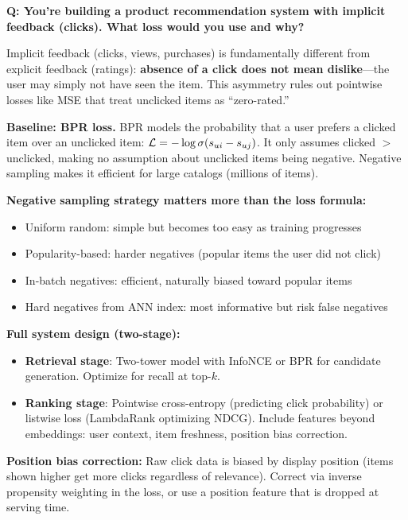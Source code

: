 \begin{interviewq}
\textbf{Q: You're building a product recommendation system with implicit feedback (clicks). What loss would you use and why?}

 \quad {} \quad \badgefreq{\freqhigh}

\stronganswer Implicit feedback (clicks, views, purchases) is fundamentally different from explicit feedback (ratings): \textbf{absence of a click does not mean dislike}---the user may simply not have seen the item. This asymmetry rules out pointwise losses like MSE that treat unclicked items as ``zero-rated.''

\textbf{Baseline: BPR loss.} BPR models the probability that a user prefers a clicked item over an unclicked item: $\mathcal{L} = -\log\sigma(s_{ui} - s_{uj})$. It only assumes clicked $>$ unclicked, making no assumption about unclicked items being negative. Negative sampling makes it efficient for large catalogs (millions of items).

\textbf{Negative sampling strategy matters more than the loss formula:}
\begin{itemize}
    \item Uniform random: simple but becomes too easy as training progresses
    \item Popularity-based: harder negatives (popular items the user did not click)
    \item In-batch negatives: efficient, naturally biased toward popular items
    \item Hard negatives from ANN index: most informative but risk false negatives
\end{itemize}

\textbf{Full system design (two-stage):}
\begin{itemize}
    \item \textbf{Retrieval stage}: Two-tower model with InfoNCE or BPR for candidate generation. Optimize for recall at top-$k$.
    \item \textbf{Ranking stage}: Pointwise cross-entropy (predicting click probability) or listwise loss (LambdaRank optimizing NDCG). Include features beyond embeddings: user context, item freshness, position bias correction.
\end{itemize}

\textbf{Position bias correction:} Raw click data is biased by display position (items shown higher get more clicks regardless of relevance). Correct via inverse propensity weighting in the loss, or use a position feature that is dropped at serving time.


\end{interviewq}
